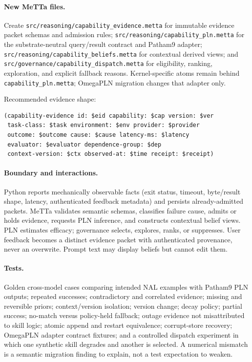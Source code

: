 \documentclass[11pt]{article}
\begin{document}
\paragraph{New MeTTa files.}
Create \texttt{src/reasoning/capability\_evidence.metta} for immutable evidence
packet schemas and admission rules; \texttt{src/reasoning/capability\_pln.metta}
for the substrate-neutral query/result contract and Patham9 adapter;
\texttt{src/reasoning/capability\_beliefs.metta} for contextual derived views;
and \texttt{src/governance/capability\_dispatch.metta} for eligibility, ranking,
exploration, and explicit fallback reasons.  Kernel-specific atoms remain behind
\texttt{capability\_pln.metta}; OmegaPLN migration changes that adapter only.

Recommended evidence shape:
\begin{lstlisting}
(capability-evidence id: $eid capability: $cap version: $ver
 task-class: $task environment: $env provider: $provider
 outcome: $outcome cause: $cause latency-ms: $latency
 evaluator: $evaluator dependence-group: $dep
 context-version: $ctx observed-at: $time receipt: $receipt)
\end{lstlisting}

\paragraph{Boundary and interactions.}
Python reports mechanically observable facts (exit status, timeout, byte/result
shape, latency, authenticated feedback metadata) and persists already-admitted
packets.  MeTTa validates semantic schemas, classifies failure cause, admits or
holds evidence, requests PLN inference, and constructs contextual belief views.
PLN estimates efficacy; governance selects, explores, ranks, or suppresses.  User
feedback becomes a distinct evidence packet with authenticated provenance, never
an overwrite.  Prompt text may display beliefs but cannot edit them.

\paragraph{Tests.}
Golden cross-model cases comparing intended NAL examples with Patham9 PLN outputs;
repeated successes; contradictory and correlated evidence; missing and reversible
priors; context/version isolation; version change; decay policy; partial success;
no-match versus policy-held fallback; outage evidence not misattributed to skill
logic; atomic append and restart equivalence; corrupt-store recovery; OmegaPLN
adapter contract fixtures; and a controlled dispatch experiment in which one
synthetic skill degrades and another is selected.  A numerical mismatch is a
semantic migration finding to explain, not a test expectation to weaken.
\end{document}
